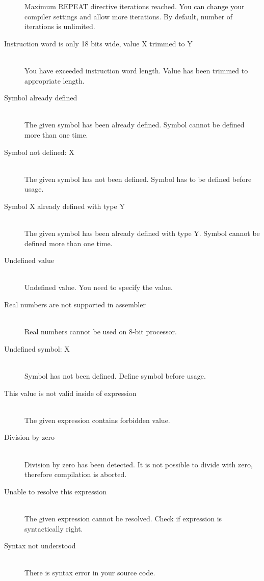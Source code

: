 \begin{description}
                Maximum REPEAT directive iterations reached. You can change your compiler settings and allow more iterations. By default, number of iterations is unlimited.
            \item[Instruction word is only 18 bits wide, value X trimmed to Y]~\\
                You have exceeded instruction word length. Value has been trimmed to  appropriate length.
            \item[Symbol already defined]~\\
                The given symbol has been already defined. Symbol cannot be defined more than one time.
            \item[Symbol not defined: X]~\\
                The given symbol has not been defined. Symbol has to be defined before usage.
            \item[Symbol X already defined with type Y]~\\
                The given symbol has been already defined with type Y. Symbol cannot be defined more than one time.
            \item[Undefined value]~\\
                Undefined value. You need to specify the value.
            \item[Real numbers are not supported in assembler]~\\
                Real numbers cannot be used on 8-bit processor.
            \item[Undefined symbol: X]~\\
                Symbol has not been defined. Define symbol before usage.
            \item[This value is not valid inside of expression ]~\\
                The given expression contains forbidden value.
            \item[Division by zero]~\\
                Division by zero has been detected. It is not possible to divide with zero, therefore compilation is aborted.
            \item[Unable to resolve this expression]~\\
                The given expression cannot be resolved. Check if expression is syntactically right.
            \item[Syntax not understood]~\\
                There is syntax error in your source code.

\end{description}
